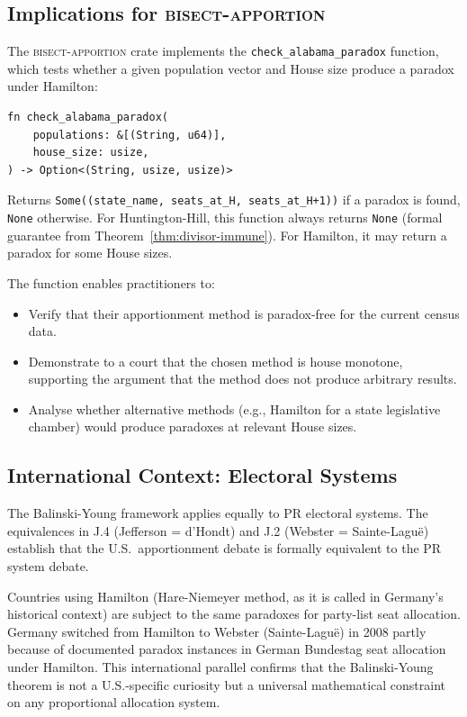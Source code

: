 \subsection{Implications for \textsc{bisect-apportion}}

The \textsc{bisect-apportion} crate implements the
\texttt{check\_alabama\_paradox} function, which tests whether
a given population vector and House size produce a paradox
under Hamilton:
\begin{verbatim}
fn check_alabama_paradox(
    populations: &[(String, u64)],
    house_size: usize,
) -> Option<(String, usize, usize)>
\end{verbatim}
Returns \texttt{Some((state\_name, seats\_at\_H, seats\_at\_H+1))}
if a paradox is found, \texttt{None} otherwise.
For Huntington-Hill, this function always returns \texttt{None}
(formal guarantee from Theorem~\ref{thm:divisor-immune}).
For Hamilton, it may return a paradox for some House sizes.

The function enables practitioners to:
\begin{itemize}
  \item Verify that their apportionment method is paradox-free
    for the current census data.
  \item Demonstrate to a court that the chosen method is
    house monotone, supporting the argument that the method
    does not produce arbitrary results.
  \item Analyse whether alternative methods (e.g., Hamilton for a
    state legislative chamber) would produce paradoxes at relevant
    House sizes.
\end{itemize}

\subsection{International Context: Electoral Systems}

The Balinski-Young framework applies equally to PR electoral systems.
The equivalences in J.4 (Jefferson = d'Hondt) and J.2 (Webster =
Sainte-Lagu\"e) establish that the U.S.\ apportionment debate
is formally equivalent to the PR system debate.

Countries using Hamilton (Hare-Niemeyer method, as it is called
in Germany's historical context) are subject to the same paradoxes
for party-list seat allocation.
Germany switched from Hamilton to Webster (Sainte-Lagu\"e) in 2008
partly because of documented paradox instances in German Bundestag
seat allocation under Hamilton.
This international parallel confirms that the Balinski-Young theorem
is not a U.S.-specific curiosity but a universal mathematical
constraint on any proportional allocation system.
